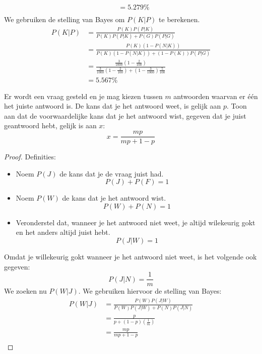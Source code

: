 \documentclass[main.tex]{subfiles}
\begin{document}
\begin{oef}
\[\begin{array}{rl}
    &= 5.279 \% \\
  \end{array}
  \]
  We gebruiken de stelling van Bayes om $P(K|P)$ te berekenen.
  \[
  \begin{array}{rl}
    P(K|P)
    &= \frac{P(K)P(P|K)}{P(K)P(P|K) + P(G)P(P|G)}\\
    &= \frac{P(K)\left(1-P(N|K)\right)}{P(K)\left(1-P(N|K)\right) + (1-P(K))P(P|G)}\\
    &= \frac{\frac{3}{1000}\left(1-\frac{2}{100}\right)}{\frac{3}{1000}\left(1-\frac{2}{100}\right) + \left(1-\frac{3}{1000}\right)\frac{5}{100}}\\
    &= 5.567 \%
  \end{array}
  \]
\end{oef}

\begin{oef}
  Er wordt een vraag gesteld en je mag kiezen tussen $m$ antwoorden waarvan er \'e\'en het juiste antwoord is. De kans dat je het antwoord weet, is gelijk aan $p$. Toon aan dat de voorwaardelijke kans dat je het antwoord wist, gegeven dat je juist geantwoord hebt, gelijk is aan $x$:
  \[ x = \frac{mp}{mp + 1 - p} \]
  \begin{proof}
    Definities:
    \begin{itemize}
    \item Noem $P(J)$ de kans dat je de vraag juist had.
      \[ P(J) + P(F) = 1 \]
    \item Noem $P(W)$ de kans dat je het antwoord wist.
      \[ P(W) + P(N) = 1 \]
    \item Veronderstel dat, wanneer je het antwoord niet weet, je altijd wilekeurig gokt en het anders altijd juist hebt.
      \[ P(J|W) = 1 \]
    \end{itemize}
    Omdat je willekeurig gokt wanneer je het antwoord niet weet, is het volgende ook gegeven:
    \[ P(J|N) = \frac{1}{m} \]
    We zoeken nu $P(W|J)$.
    We gebruiken hiervoor de stelling van Bayes:
    \[
    \begin{array}{rl}
      P(W|J)
      &= \frac{P(W)P(J|W)}{P(W)P(J|W) + P(N)P(J|N)}\\
      &= \frac{p}{p + (1-p)\left(\frac{1}{m}\right)}\\
      &= \frac{mp}{mp + 1-p}\\
    \end{array}
    \]
  \end{proof}
\end{oef}
\end{document}
